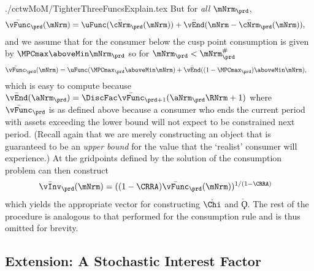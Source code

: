 \documentclass[\econtexRoot/SolvingMicroDSOPs]{subfiles}
\begin{document}
\begin{verbatimwrite}{./cctwMoM/TighterThreeFuncsExplain.tex}
  But for \textit{all} $\mNrm_{\prd}$,
  \begin{equation*}\begin{gathered}\begin{aligned}
        \bar{\vFunc}_{\prd}(\mNrm)  & = \uFunc(\bar{\cNrm}_{\prd}(\mNrm))+ \bar{\vEnd}(\mNrm-\bar{\cNrm}_{\prd}(\mNrm)),
      \end{aligned}\end{gathered}\end{equation*}
  and we assume that for the consumer below the cusp point consumption is given by $\MPCmax \aboveMin \mNrm_{\prd}$ so for $\mNrm_{\prd}< \mtCusp$
  \begin{equation*}\begin{gathered}\begin{aligned}
        \bar{\vFunc}_{\prd}(\mNrm)  & = \uFunc( \MPCmax_{\prd} \aboveMin \mNrm)+ \bar{\vEnd}((1-\MPCmax_{\prd})\aboveMin \mNrm),
      \end{aligned}\end{gathered}\end{equation*}
  which is easy to compute because $\bar{\vEnd}(\aNrm_{\prd}) = \DiscFac \bar{\vFunc}_{\prd+1}(\aNrm_{\prd}\RNrm+1)$ where $\bar{\vFunc}_{\prd}$ is as defined above because a consumer who ends the current period with assets exceeding the lower bound will not expect to be constrained next period.  (Recall again that we are merely constructing an object that is guaranteed to be an \textit{upper bound} for the value that the `realist' consumer will experience.)  At the gridpoints defined by the solution of the consumption problem can then construct
  \begin{equation*}\begin{gathered}\begin{aligned}
        \bar{\vInv}_{\prd}(\mNrm)  & = ((1-\CRRA)\bar{\vFunc}_{\prd}(\mNrm))^{1/(1-\CRRA)}
      \end{aligned}\end{gathered}\end{equation*}
 which yields the appropriate vector for constructing $\check{\Chi}$ and $\check{\Koppa}$.  The rest of the procedure is analogous to that performed for the consumption rule and is thus omitted for brevity.

\end{verbatimwrite}
\unskip

\hypertarget{extension-a-stochastic-interest-factor}{}
\subsection{Extension: A Stochastic Interest Factor}
\end{document}
